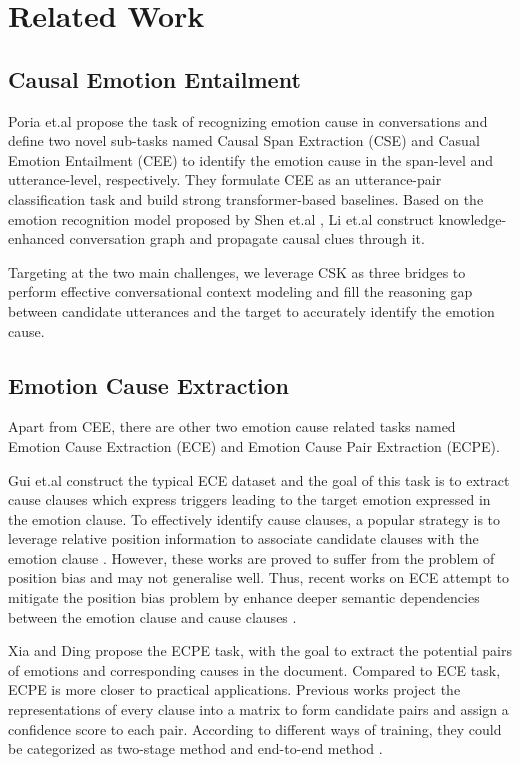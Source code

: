 \documentclass[letterpaper]{article} \usepackage{aaai23}  \usepackage{times}  \usepackage{helvet}  \usepackage{courier}  \usepackage[hyphens]{url}  \usepackage{graphicx} \urlstyle{rm} \def\UrlFont{\rm}  \usepackage{natbib}  \usepackage{caption} \frenchspacing  \setlength{\pdfpagewidth}{8.5in} \setlength{\pdfpageheight}{11in} \usepackage{algorithm}
\begin{document}
\section{Related Work}

\subsection{Causal Emotion Entailment}
Poria et.al  propose the task of recognizing emotion cause in conversations and define two novel sub-tasks named Causal Span Extraction (CSE) and Casual Emotion Entailment (CEE) to identify the emotion cause in the span-level and utterance-level, respectively. They formulate CEE as an utterance-pair classification task and build strong transformer-based baselines. Based on the emotion recognition model proposed by Shen et.al , Li et.al  construct knowledge-enhanced conversation graph and propagate causal clues through it.

Targeting at the two main challenges, we leverage CSK as three bridges to perform effective conversational context modeling and fill the reasoning gap between candidate utterances and the target to accurately identify the emotion cause.

\subsection{Emotion Cause Extraction}
Apart from CEE, there are other two emotion cause related tasks named Emotion Cause Extraction (ECE) and Emotion Cause Pair Extraction (ECPE).

Gui et.al  construct the typical ECE dataset and the goal of this task is to extract cause clauses which express triggers leading to the target emotion expressed in the emotion clause. To effectively identify cause clauses, a popular strategy is to leverage relative position information to associate candidate clauses with the emotion clause \cite{ding2019,xia2019,li2019}. However, these works are proved to suffer from the problem of position bias and may not generalise well. Thus, recent works on ECE attempt to mitigate the position bias problem by enhance deeper semantic dependencies between the emotion clause and cause clauses \cite{kag}.

Xia and Ding  propose the ECPE task, with the goal to extract the potential pairs of emotions and corresponding causes in the document. Compared to ECE task, ECPE is more closer to practical applications. Previous works project the representations of every clause into a matrix to form candidate pairs and assign a confidence score to each pair. According to different ways of training, they could be categorized as two-stage method \cite{ecpe-2d} and end-to-end method \cite{ecpe-mll,rankcp,ece-2022}.
\end{document}
